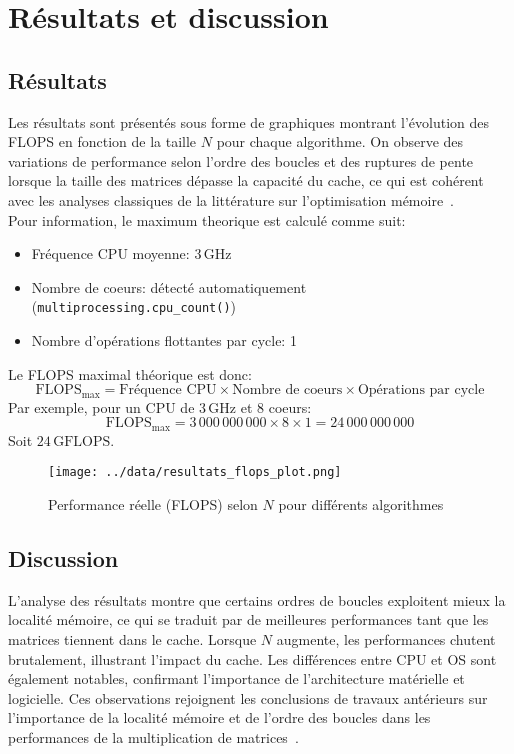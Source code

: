 \documentclass[a4paper,12pt]{article}
\begin{document}
\section{Résultats et discussion}

\subsection*{Résultats}
Les résultats sont présentés sous forme de graphiques montrant l'évolution des FLOPS en fonction de la taille \(N\) pour chaque algorithme. 
On observe des variations de performance selon l'ordre des boucles et des ruptures de pente lorsque la taille des matrices dépasse la capacité du cache, 
ce qui est cohérent avec les analyses classiques de la littérature sur l'optimisation mémoire~\cite{devto}.
\\
Pour information, le maximum theorique est calculé comme suit:
\begin{itemize}
    \item Fréquence CPU moyenne: \(3\,\mathrm{GHz}\)
    \item Nombre de coeurs: détecté automatiquement (\texttt{multiprocessing.cpu\_count()})
    \item Nombre d'opérations flottantes par cycle: 1
\end{itemize}
\vspace{0.2cm}
Le FLOPS maximal théorique est donc:
\[
\text{FLOPS}_{\text{max}} = \text{Fréquence CPU} \times \text{Nombre de coeurs} \times \text{Opérations par cycle}
\]
Par exemple, pour un CPU de 3\,GHz et 8 coeurs:
\[
\text{FLOPS}_{\text{max}} = 3\,000\,000\,000 \times 8 \times 1 = 24\,000\,000\,000
\]
Soit \(24\,\mathrm{GFLOPS}\).


\begin{figure}[h]
    \centering
    \texttt{[image: ../data/resultats\_flops\_plot.png]}
    \caption{Performance réelle (FLOPS) selon \(N\) pour différents algorithmes}

\end{figure}

\subsection*{Discussion}
L'analyse des résultats montre que certains ordres de boucles exploitent mieux la localité mémoire, 
ce qui se traduit par de meilleures performances tant que les matrices tiennent dans le cache. Lorsque \(N\) augmente, 
les performances chutent brutalement, illustrant l'impact du cache. Les différences entre CPU et OS sont également notables, 
confirmant l'importance de l'architecture matérielle et logicielle. Ces observations rejoignent les conclusions de travaux antérieurs 
sur l'importance de la localité mémoire et de l'ordre des boucles dans 
les performances de la multiplication de matrices~\cite{wikics, stackoverflow}.
\end{document}
